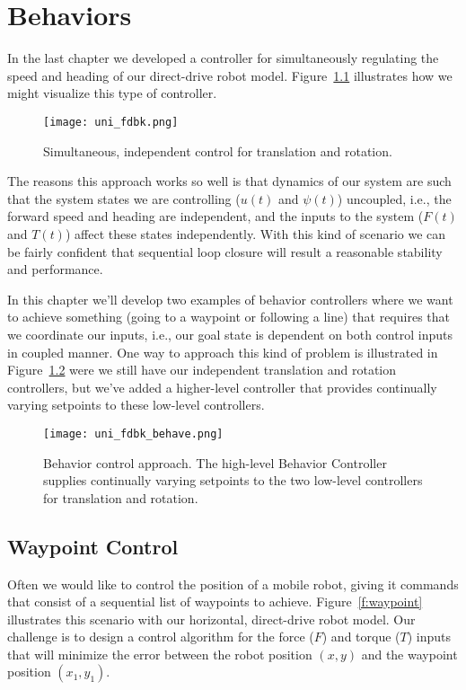 \chapter{Behaviors}\label{c:behave}
In the last chapter we developed a controller for simultaneously regulating the speed and heading of our direct-drive robot model.  Figure~\ref{f:uni_fdbk} illustrates how we might visualize this type of controller.
\begin{figure}[hbt]
\centering
\texttt{[image: uni\_fdbk.png]}
\caption{Simultaneous, independent control for translation and rotation.}
\label{f:uni_fdbk}
\end{figure}
The reasons this approach works so well is that dynamics of our system are such that the system states we are controlling ($u(t)$ and $\psi(t)$) uncoupled, i.e., the forward speed and heading are independent, and the inputs to the system ($F(t)$ and $T(t)$) affect these states independently.  With this kind of scenario we can be fairly confident that sequential loop closure will result a reasonable stability and performance.

In this chapter we'll develop two examples of behavior controllers where we want to achieve something (going to a waypoint or following a line) that requires that we coordinate our inputs, i.e., our goal state is dependent on both control inputs in coupled manner.  One way to approach this kind of problem is illustrated in Figure~\ref{f:uni_fdbk_behave} were we still have our independent translation and rotation controllers, but we've added a higher-level controller that provides continually varying setpoints to these low-level controllers.
\begin{figure}[hbt]
\centering
\texttt{[image: uni\_fdbk\_behave.png]}
\caption{Behavior control approach.  The high-level Behavior Controller supplies continually varying setpoints to the two low-level controllers for translation and rotation.}
\label{f:uni_fdbk_behave}
\end{figure}


\section{Waypoint Control}
Often we would like to control the position of a mobile robot, giving it commands that consist of a sequential list of waypoints to achieve.  Figure~\ref{f:waypoint} illustrates this scenario with our horizontal, direct-drive robot model.  Our challenge is to design a control algorithm for the force ($F$) and torque ($T$) inputs that will minimize the error between the robot position $(x,y)$ and the waypoint position $(x_1,y_1)$.  

